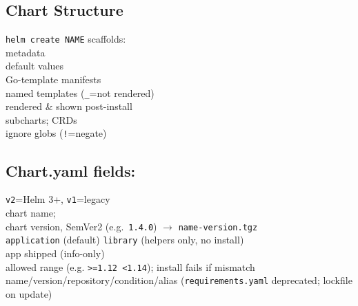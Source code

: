 \subsection{Chart Structure}
\texttt{helm create NAME} scaffolds: \\
 metadata \\
 default values \\
 Go-template manifests \\
  named templates (\texttt{\_}=not rendered) \\
  rendered \& shown post-install \\
 subcharts;   CRDs \\
 ignore globs (\texttt{!}=negate)
\subsection{Chart.yaml fields:}
 \texttt{v2}=Helm 3+, \texttt{v1}=legacy \\
 chart name; \\
 chart version, SemVer2 (e.g.\ \texttt{1.4.0}) $\to$ \texttt{name-version.tgz} \\
 \texttt{application} (default) \textbar{} \texttt{library} (helpers only, no install) \\
 app shipped (info-only) \\
 allowed range (e.g. \texttt{>=1.12 <1.14}); install fails if mismatch \\
 name/version/repository/condition/alias (\texttt{requirements.yaml} deprecated; lockfile on update)

